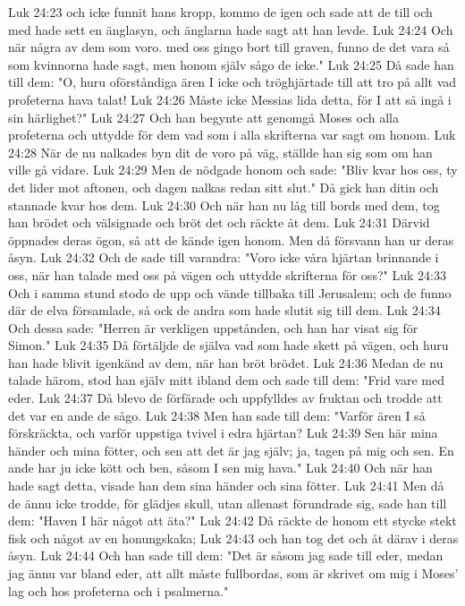 Luk 24:23  och icke funnit hans kropp, kommo de igen och sade att de till och med hade sett en änglasyn, och änglarna hade sagt att han levde.
Luk 24:24  Och när några av dem som voro. med oss gingo bort till graven, funno de det vara så som kvinnorna hade sagt, men honom själv sågo de icke."
Luk 24:25  Då sade han till dem: "O, huru oförståndiga ären I icke och tröghjärtade till att tro på allt vad profeterna hava talat!
Luk 24:26  Måste icke Messias lida detta, för I att så ingå i sin härlighet?"
Luk 24:27  Och han begynte att genomgå Moses och alla profeterna och uttydde för dem vad som i alla skrifterna var sagt om honom.
Luk 24:28  När de nu nalkades byn dit de voro på väg, ställde han sig som om han ville gå vidare.
Luk 24:29  Men de nödgade honom och sade: "Bliv kvar hos oss, ty det lider mot aftonen, och dagen nalkas redan sitt slut." Då gick han ditin och stannade kvar hos dem.
Luk 24:30  Och när han nu låg till bords med dem, tog han brödet och välsignade och bröt det och räckte åt dem.
Luk 24:31  Därvid öppnades deras ögon, så att de kände igen honom. Men då försvann han ur deras åsyn.
Luk 24:32  Och de sade till varandra: "Voro icke våra hjärtan brinnande i oss, när han talade med oss på vägen och uttydde skrifterna för oss?"
Luk 24:33  Och i samma stund stodo de upp och vände tillbaka till Jerusalem; och de funno där de elva församlade, så ock de andra som hade slutit sig till dem.
Luk 24:34  Och dessa sade: "Herren är verkligen uppstånden, och han har visat sig för Simon."
Luk 24:35  Då förtäljde de själva vad som hade skett på vägen, och huru han hade blivit igenkänd av dem, när han bröt brödet.
Luk 24:36  Medan de nu talade härom, stod han själv mitt ibland dem och sade till dem: "Frid vare med eder.
Luk 24:37  Då blevo de förfärade och uppfylldes av fruktan och trodde att det var en ande de sågo.
Luk 24:38  Men han sade till dem: "Varför ären I så förskräckta, och varför uppstiga tvivel i edra hjärtan?
Luk 24:39  Sen här mina händer och mina fötter, och sen att det är jag själv; ja, tagen på mig och sen. En ande har ju icke kött och ben, såsom I sen mig hava."
Luk 24:40  Och när han hade sagt detta, visade han dem sina händer och sina fötter.
Luk 24:41  Men då de ännu icke trodde, för glädjes skull, utan allenast förundrade sig, sade han till dem: "Haven I här något att äta?"
Luk 24:42  Då räckte de honom ett stycke stekt fisk och något av en honungskaka;
Luk 24:43  och han tog det och åt därav i deras åsyn.
Luk 24:44  Och han sade till dem: "Det är såsom jag sade till eder, medan jag ännu var bland eder, att allt måste fullbordas, som är skrivet om mig i Moses' lag och hos profeterna och i psalmerna."
